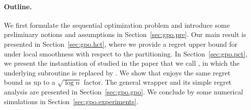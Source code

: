 \paragraph{Outline.}
We first formulate the sequential optimization problem and introduce some preliminary notions and assumptions in Section~\ref{sec:gpo.pre}. Our main result is presented in Section~\ref{sec:gpo.hct}, where we provide a regret upper bound for \HCT under local smoothness with respect to the partitioning. In Section~\ref{sec:gpo.pct}, we present the instantiation of \POO studied in the paper that we call \PCT, in which the underlying subroutine \HOO is replaced by \HCT. We show that \PCT enjoys the same regret bound as \HCT up to a $\sqrt{\log n}$ factor. The general wrapper and its simple regret analysis are presented in Section~\ref{sec:gpo.gpo}. We conclude by some numerical simulations in Section~\ref{sec:gpo.experiments}.

